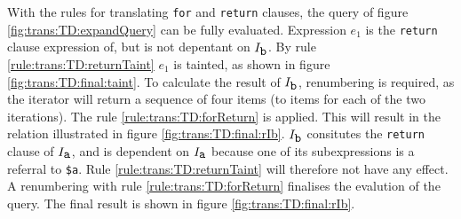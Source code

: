 \begin{myExample}

With the rules for translating \texttt{for} and \texttt{return} clauses, the query of figure
\ref{fig:trans:TD:expandQuery} can be fully evaluated. Expression $e_{1}$ is the \texttt{return} clause expression
of, but is not depentant on $I_{\mbox{\texttt{b}}}$. By rule \ref{rule:trans:TD:returnTaint} $e_{1}$ is tainted,
as shown in figure \ref{fig:trans:TD:final:taint}. To calculate the result of $I_{\mbox{\texttt{b}}}$,
renumbering is required, as the iterator will return a sequence of four items (to items for each of the two
iterations). The rule \ref{rule:trans:TD:forReturn} is applied. This will result in the relation illustrated in
figure \ref{fig:trans:TD:final:rIb}. $I_{\mbox{\texttt{b}}}$ consitutes the \texttt{return} clause of
$I_{\mbox{\texttt{a}}}$, and is dependent on $I_{\mbox{\texttt{a}}}$ because one of its subexpressions is a
referral to \texttt{\$a}. Rule \ref{rule:trans:TD:returnTaint} will therefore not have any effect. A renumbering
with rule \ref{rule:trans:TD:forReturn} finalises the evalution of the query. The final result is shown in figure
\ref{fig:trans:TD:final:rIb}.



\end{myExample}
